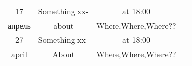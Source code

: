 \documentclass[final]{beamer} %
\date{\today}
\begin{document}
\begin{frame}{} 
\vfill

 \centering
\begin{table}
\begin{tabular}{| c | c | c | c |}

  {\Large 17 }   & {\Large Something} xx-  & {\normalsize at 18:00}\\
  {\normalsize апрель} & {\normalsize about} & {\footnotesize Where,Where,Where??}\\
  \hline  \hline
  {\Large 27 }   & {\Large Something} xx-  & {\normalsize at 18:00}\\
  {\normalsize april} & {\normalsize About} & {\footnotesize Where,Where,Where??}\\
\end{tabular}
\end{table}
\vfill
\end{frame}
\end{document}
